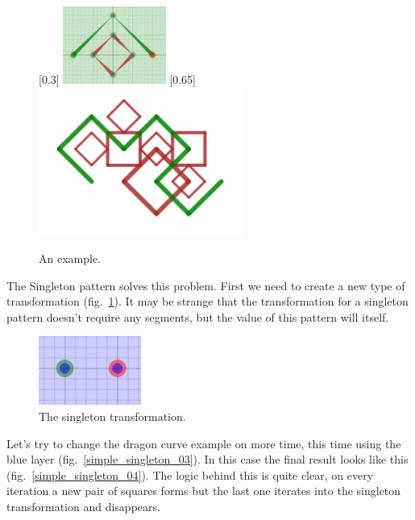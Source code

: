         \begin{figure}[ht]
            \caption{An example.}
            \centering
            [0.3\textwidth]
                {\includegraphics[width=0.3\textwidth]{img/Simple_Techniques/Singleton/simple_singleton_01.png}}
            [0.65\textwidth]
                {\includegraphics[width=0.6\textwidth]{img/Simple_Techniques/Singleton/simple_singleton_02.png}}
        \end{figure}

        The Singleton pattern solves this problem.
        First we need to create a new type of transformation (fig.~\ref{simple_single_03}).
        It may be strange that the transformation for a singleton pattern doesn't require any segments,
            but the value of this pattern will itself.

        \begin{figure}[ht]
            \caption{\label{simple_single_03} The singleton transformation.}
            \centering
            \includegraphics[width=0.3\textwidth]{img/Simple_Techniques/Singleton/simple_single_setup_02.png}
        \end{figure}

        Let's try to change the dragon curve example on more time, this time using the blue layer (fig.~\ref{simple_singleton_03}).
        In this case the final result looks like this (fig.~\ref{simple_singleton_04}).
        The logic behind this is quite clear, on every iteration a new pair of squares forms but the last one iterates into the singleton transformation and disappears.

